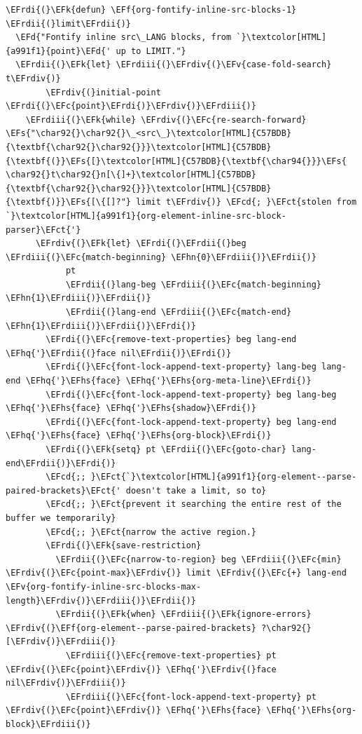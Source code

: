 \documentclass{scrartcl}
\newcommand{\EFk}[1]{\textcolor{EFk}{#1}} %
\newcommand{\EFd}[1]{\textcolor{EFd}{#1}} %
\newcommand{\EFs}[1]{\textcolor{EFs}{#1}} %
\newcommand{\EFct}[1]{\textcolor{EFct}{#1}} %
\newcommand{\EFc}[1]{\textcolor{EFc}{#1}} %
\newcommand{\EFv}[1]{\textcolor{EFv}{#1}} %
\newcommand{\EFf}[1]{\textcolor{EFf}{#1}} %
\newcommand{\EFcd}[1]{\textcolor{EFcd}{#1}} %
\newcommand{\EFhn}[1]{#1} %
\newcommand{\EFhq}[1]{#1} %
\newcommand{\EFhs}[1]{#1} %
\newcommand{\EFrdi}[1]{#1} %
\newcommand{\EFrdii}[1]{#1} %
\newcommand{\EFrdiii}[1]{#1} %
\newcommand{\EFrdiv}[1]{#1} %
\begin{document}
\begin{Code}
\begin{Verbatim}[]
\EFrdi{(}\EFk{defun} \EFf{org-fontify-inline-src-blocks-1} \EFrdii{(}limit\EFrdii{)}
  \EFd{"Fontify inline src\_LANG blocks, from `}\textcolor[HTML]{a991f1}{point}\EFd{' up to LIMIT."}
  \EFrdii{(}\EFk{let} \EFrdiii{(}\EFrdiv{(}\EFv{case-fold-search} t\EFrdiv{)}
        \EFrdiv{(}initial-point \EFrdi{(}\EFc{point}\EFrdi{)}\EFrdiv{)}\EFrdiii{)}
    \EFrdiii{(}\EFk{while} \EFrdiv{(}\EFc{re-search-forward} \EFs{"\char92{}\char92{}\_<src\_}\textcolor[HTML]{C57BDB}{\textbf{\char92{}\char92{}}}\textcolor[HTML]{C57BDB}{\textbf{(}}\EFs{[}\textcolor[HTML]{C57BDB}{\textbf{\char94{}}}\EFs{ \char92{}t\char92{}n[\{]+}\textcolor[HTML]{C57BDB}{\textbf{\char92{}\char92{}}}\textcolor[HTML]{C57BDB}{\textbf{)}}\EFs{[\{[]?"} limit t\EFrdiv{)} \EFcd{; }\EFct{stolen from `}\textcolor[HTML]{a991f1}{org-element-inline-src-block-parser}\EFct{'}
      \EFrdiv{(}\EFk{let} \EFrdi{(}\EFrdii{(}beg \EFrdiii{(}\EFc{match-beginning} \EFhn{0}\EFrdiii{)}\EFrdii{)}
            pt
            \EFrdii{(}lang-beg \EFrdiii{(}\EFc{match-beginning} \EFhn{1}\EFrdiii{)}\EFrdii{)}
            \EFrdii{(}lang-end \EFrdiii{(}\EFc{match-end} \EFhn{1}\EFrdiii{)}\EFrdii{)}\EFrdi{)}
        \EFrdi{(}\EFc{remove-text-properties} beg lang-end \EFhq{'}\EFrdii{(}face nil\EFrdii{)}\EFrdi{)}
        \EFrdi{(}\EFc{font-lock-append-text-property} lang-beg lang-end \EFhq{'}\EFhs{face} \EFhq{'}\EFhs{org-meta-line}\EFrdi{)}
        \EFrdi{(}\EFc{font-lock-append-text-property} beg lang-beg \EFhq{'}\EFhs{face} \EFhq{'}\EFhs{shadow}\EFrdi{)}
        \EFrdi{(}\EFc{font-lock-append-text-property} beg lang-end \EFhq{'}\EFhs{face} \EFhq{'}\EFhs{org-block}\EFrdi{)}
        \EFrdi{(}\EFk{setq} pt \EFrdii{(}\EFc{goto-char} lang-end\EFrdii{)}\EFrdi{)}
        \EFcd{;; }\EFct{`}\textcolor[HTML]{a991f1}{org-element--parse-paired-brackets}\EFct{' doesn't take a limit, so to}
        \EFcd{;; }\EFct{prevent it searching the entire rest of the buffer we temporarily}
        \EFcd{;; }\EFct{narrow the active region.}
        \EFrdi{(}\EFk{save-restriction}
          \EFrdii{(}\EFc{narrow-to-region} beg \EFrdiii{(}\EFc{min} \EFrdiv{(}\EFc{point-max}\EFrdiv{)} limit \EFrdiv{(}\EFc{+} lang-end \EFv{org-fontify-inline-src-blocks-max-length}\EFrdiv{)}\EFrdiii{)}\EFrdii{)}
          \EFrdii{(}\EFk{when} \EFrdiii{(}\EFk{ignore-errors} \EFrdiv{(}\EFf{org-element--parse-paired-brackets} ?\char92{}[\EFrdiv{)}\EFrdiii{)}
            \EFrdiii{(}\EFc{remove-text-properties} pt \EFrdiv{(}\EFc{point}\EFrdiv{)} \EFhq{'}\EFrdiv{(}face nil\EFrdiv{)}\EFrdiii{)}
            \EFrdiii{(}\EFc{font-lock-append-text-property} pt \EFrdiv{(}\EFc{point}\EFrdiv{)} \EFhq{'}\EFhs{face} \EFhq{'}\EFhs{org-block}\EFrdiii{)}

\end{Verbatim}
\end{Code}
\end{document}
